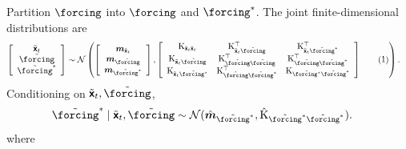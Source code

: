 \documentclass{article}
\newcommand\numberthis{\addtocounter{equation}{1}\tag{\theequation}}
\newcommand{\vv}[1]{\boldsymbol{#1}}
\newcommand{\mm}[1]{\mathrm{#1}}
\newcommand{\rv}[1]{\mathsf{#1}}
\newcommand{\dist}[1]{\mathcal{#1}}
\newcommand{\gvn}{\mid}
\newcommand{\state}{\rv{x}}
\begin{document}
Partition \(\forcing\) into \(\forcing\) and \(\forcing^{*}\).
The joint finite-dimensional distributions are
\begin{align*}
\left[\begin{array}{c}
    \tilde{\vv{\state}}_{t} \\
    \tilde{\forcing}\\
    \tilde{\forcing}^{*}
\end{array}\right]
&\sim\dist{N}\left(
    \left[\begin{array}{c}
        \vv{m}_{\tilde{\vv{\state}}_{t}}\\
        \vv{m}_{\tilde{\forcing}}\\
        \vv{m}_{\tilde{\forcing}^{*}}
    \end{array}\right],
    \left[\begin{array}{ccc}
        \mm{K}_{\tilde{\vv{\state}}_{t}\tilde{\vv{\state}}_{t}}
        & \mm{K}_{\tilde{\vv{\state}}_{t}\tilde{\forcing}}^{\top}
        & \mm{K}_{\tilde{\vv{\state}}_{t}\tilde{\forcing}^{*}}^{\top} \\
          \mm{K}_{\tilde{\vv{\state}}_{t}\tilde{\forcing}}
        & \mm{K}_{\tilde{\forcing}\tilde{\forcing}}^{\top}
        & \mm{K}_{\tilde{\forcing}\tilde{\forcing}^{*}}^{\top} \\
          \mm{K}_{\tilde{\vv{\state}}_{t}\tilde{\forcing^{*}}}
        & \mm{K}_{\tilde{\forcing}\tilde{\forcing}^{*}}^{\top}
        & \mm{K}_{\tilde{\forcing^{*}}\tilde{\forcing}^{*}} \\
    \end{array}\right]\numberthis\label{eq:discrete_joint_naive_sub}
\right).
\end{align*}
Conditioning on \(\tilde{\vv{\state}}_{t},\tilde{\forcing}\),
\begin{align*}
    \tilde{\forcing}^{*}\gvn  \tilde{\vv{\state}}_{t},\tilde{\forcing}
&\sim\dist{N}(
    \hat{\vv{m}}_{\tilde{\forcing}^{*}},
    \hat{\mm{K}}_{\tilde{\forcing}^{*}\tilde{\forcing}^{*}}
).
\end{align*}
where
\end{document}
